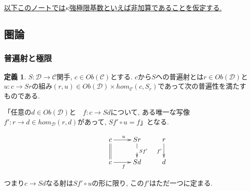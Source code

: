 \documentclass[dvipdfmx,a4paper,11pt]{report}
\theoremstyle{definition}
\newtheorem{dfn}[thm]{定義}
\begin{document}
 
\underline{ 以下このノートでは$\kappa$強極限基数といえば非加算であることを仮定する.}


\subsection{圏論}
\subsubsection{普遍射と極限}
 
 
 \begin{tcolorbox}
 [colback = white, colframe = green!35!black, fonttitle = \bfseries,breakable = true]
\begin{dfn}\cite[3.1節]{Mac}
$S : \mathcal{D} \to \mathcal{C}$関手, $c \in Ob(\mathcal{C})$とする.
$c$から$S$への普遍射とは$r \in Ob(\mathcal{D})$と $u: c \to Sr$の組み$(r,u) \in Ob(\mathcal{D})\times hom_{\mathcal{C}}(c, S_r)$であって次の普遍性を満たすものである.

「任意の$d \in Ob(\mathcal{D})$と　$f : c\to Sd$について, ある唯一な写像$f' : r \to d \in hom_{\mathcal{D}}(r,d)$があって, $Sf' \circ u =f$」となる.

\begin{equation*}
\xymatrix@C=25pt@R=20pt{
&c\ar@{=}[d]  \ar@{->}[r]^{u} & Sr\ar@{-->}[d]^{Sf'} &r\ar@{->}[d]_{f'}\\
&c\ar@{->}[r]_{f} &Sd&d \\   
}
\end{equation*}
\end{dfn}
つまり$c \to Sd$なる射は$Sf' \circ u$の形に限り, この$f'$はただ一つに定まる. 
 \end{tcolorbox}
\end{document}
